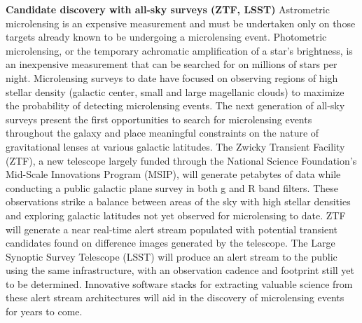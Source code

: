 \documentclass[11pt]{article}
\begin{document}
\textbf{Candidate discovery with all-sky surveys (ZTF, LSST)}
Astrometric microlensing is an expensive measurement and must be undertaken only on those targets already known to be undergoing a microlensing event. Photometric microlensing, or the temporary achromatic amplification of a star’s brightness, is an inexpensive measurement that can be searched for on millions of stars per night. Microlensing surveys to date have focused on observing regions of high stellar density (galactic center, small and large magellanic clouds) to maximize the probability of detecting microlensing events. The next generation of all-sky surveys present the first opportunities to search for microlensing events throughout the galaxy and place meaningful constraints on the nature of gravitational lenses at various galactic latitudes.  The Zwicky Transient Facility (ZTF), a new telescope largely funded through the National Science Foundation's Mid-Scale Innovations Program (MSIP), will generate petabytes of data while conducting a public galactic plane survey in both g and R band filters. These observations strike a balance between areas of the sky with high stellar densities and exploring galactic latitudes not yet observed for microlensing to date. ZTF will generate a near real-time alert stream populated with potential transient candidates found on difference images generated by the telescope. The Large Synoptic Survey Telescope (LSST) will produce an alert stream to the public using the same infrastructure, with an observation cadence and footprint still yet to be determined. Innovative software stacks for extracting valuable science from these alert stream architectures will aid in the discovery of microlensing events for years to come.
\end{document}
